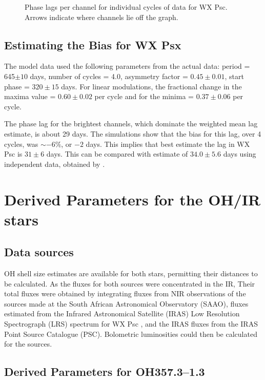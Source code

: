 \documentclass[usenatbib,usegraphicx]{mn2e}
\begin{document}
\begin{figure}
\caption{Phase lags per channel for individual cycles of data for WX Psc. 
Arrows indicate where channels lie off the graph.}
\label{fig:fstata4c}
\end{figure}


\subsection{Estimating the Bias for WX Psx}

The model data used the following parameters from the actual data: period =
645$\pm10$ days, number of cycles = 4.0, asymmetry factor = $0.45\pm0.01$,
start phase = $320\pm15$ days.  For linear modulations, the fractional
change in the maxima value = $0.60\pm0.02$ per cycle and for the minima
= $0.37\pm0.06$ per cycle.

The phase lag for the brightest channels, which dominate the weighted mean
lag estimate, is about 29 days. The simulations show that the bias for this
lag, over 4 cycles, was $\sim-6\%$, or $-2$ days. This implies that best
estimate the lag in WX Psc is $31\pm6$ days. This can be compared with
estimate of $34.0\pm5.6$ days using independent data, obtained by
\citet{vLvdHvS90}.


\section{Derived Parameters for the OH/IR stars}

\subsection{Data sources}

OH shell size estimates are available for both stars, permitting their
distances to be calculated.  As the fluxes for both sources were
concentrated in the IR, Their total fluxes were obtained by integrating
fluxes from NIR observations of the sources made at the South African
Astronomical Observatory (SAAO), fluxes estimated from the Infrared
Astronomical Satellite (IRAS) Low Resolution Spectrograph (LRS) spectrum for
WX Psc \citep{VolkCohen89}, and the IRAS fluxes from the IRAS Point Source
Catalogue (PSC).  Bolometric luminosities could then be calculated for the
sources.


\subsection{Derived Parameters for OH357.3--1.3}
\end{document}
